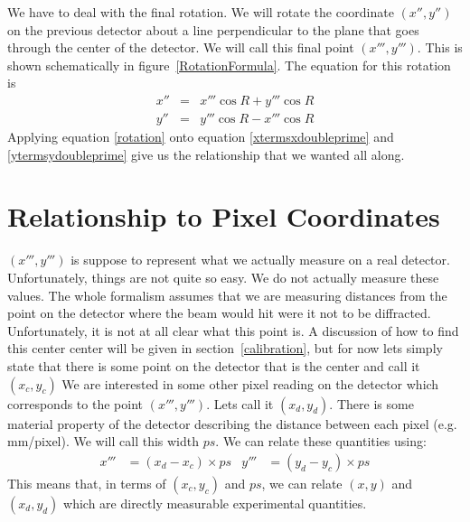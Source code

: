 \begin{SCfigure}[1][htbp]
    \centering
    
    \caption{Here, we take a point on a plane rotated
    by angle $\beta$ about $\hat y$ and by angle
    $\alpha$ about $\hat x'$. We then rotated this point
    about a line normal to the plane going through the
    origin by angle $R$. Rotating the point is 
    equivalent to rotating the plane.}
    \label{RotationFormula}
\end{SCfigure}

We have to deal with the final rotation. We will
rotate the coordinate $(x'',y'')$ on the
previous detector about a line perpendicular to
the plane that goes through the center of the
detector. We will call this final
point $(x''',y''')$. This is shown schematically 
in figure~\ref{RotationFormula}. The equation for 
this rotation is
\begin{eqnarray}\label{rotation}
    x''&=&x'''\cos R + y'''\cos R\\
    y''&=&y'''\cos R - x'''\cos R
\end{eqnarray}
Applying equation \ref{rotation} onto equation 
\ref{xtermsxdoubleprime} and \ref{ytermsydoubleprime}
give us the relationship that we wanted all along.

\section{Relationship to Pixel Coordinates}

$(x''',y''')$ is suppose to represent what we actually
measure on a real detector. Unfortunately, things are
not quite so easy. We do not actually measure these
values. The whole formalism assumes that we are 
measuring distances from the point on the
detector where the beam would hit were it not to be
diffracted. Unfortunately, it is not at all clear
what this point is. A discussion of how to find
this center center will
be given in section~\ref{calibration}, but for now
lets simply state that there is some point on the detector
that is the center and call it $(x_c,y_c)$ 
We are interested in some other pixel reading
on the detector which corresponds to the point
$(x''',y''')$. Lets call it $(x_d,y_d)$. 
There is some material property of the detector 
describing the distance between each pixel
(e.g. \unit[1000]{mm/pixel}). We will call
this width $ps$. We can relate these quantities 
using:
\begin{align}\label{conversionToPixels}
    x'''&=(x_d-x_c) \times ps &
    y'''&=(y_d-y_c) \times ps
\end{align}
This means that, in terms of $(x_c,y_c)$ and $ps$,
we can relate $(x,y)$ and $(x_d,y_d)$ which are
directly measurable experimental quantities.

